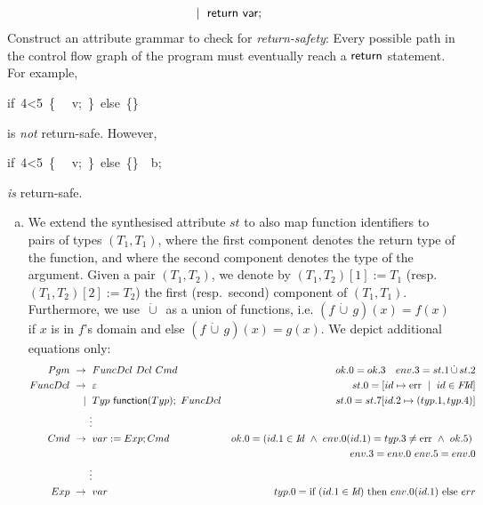 \begin{exercise}{30}
\begin{enumerate}[(a)]
\begin{align*}
	    ~{}\mid{}~& \textsf{return}~ \textsf{var};
	\end{align*} 
	Construct an attribute grammar to check for \emph{return-safety}: Every possible path in the control flow graph of the program must eventually reach a $\textsf{return}$ statement.
	For example, 
	\begin{center}
	   \textsf{if~4<5~\{~ \ret~v;~\}~else~\{\} } 
	\end{center}
	is \emph{not} return-safe. However, 
	\begin{center}
	\textsf{if~4<5~{}\{~ \ret~v;~\}~else~\{\}~\ret~b;} 
	\end{center}
	\emph{is} return-safe.
\end{enumerate}
\end{exercise}

\begin{solution}
\begin{enumerate}[(a)]
%
%
\newcommand{\dotcup}{\,\dot{\cup}\,}
\item We extend the synthesised attribute $st$ to also map function identifiers to pairs of types $(T_1, T_1)$, where the first component denotes the return type of the function, and where the second component denotes the type of the argument. Given a pair $(T_1, T_2)$, we denote by $(T_1, T_2)[1] := T_1$ (resp.\ $(T_1, T_2)[2] := T_2$) the first (resp.\ second) component of $(T_1, T_1)$. Furthermore, we use $\dotcup$ as a union of functions, i.e. $(f \dotcup g)(x) = f(x)$ if $x$ is in $f$'s domain and else $(f \dotcup g)(x) = g(x)$. We depict additional equations only:
%
\begin{align*}
Pgm  ~{}\rightarrow {}~& FuncDcl~Dcl~Cmd  & ok.0=ok.3 \quad env.3=st.1 \dotcup st.2\\
%
FuncDcl  ~{}\rightarrow~{} & \varepsilon & st.0=[id \mapsto \textnormal{err} ~\mid~id \in \FId ] \\
~{}\mid{}~& Typ~\textsf{function}(Typ);~ FuncDcl  &  st.0 = st.7[id.2 \mapsto (typ.1, typ.4)]\\
\vdots & \\
%
Cmd  ~{}\rightarrow~{} & var := Exp; Cmd & ok.0= (id.1 \in \Id ~\wedge~env.0(id.1) = typ.3 \ne \textnormal{err}~\wedge~ok.5)~ \\
&&\quad env.3=env.0~env.5=env.0\\
%
\vdots & \\
%
Exp  ~{}\rightarrow~{} & var           &   typ.0 = \text{if}~(id.1 \in \Id) ~\text{then}~ env.0(id.1) ~\text{else}~ err \\

\end{align*}
\end{enumerate}
\end{solution}
